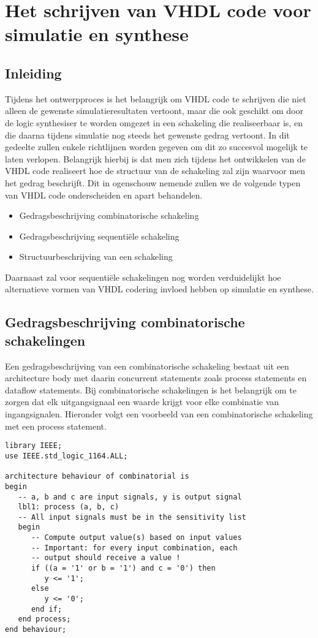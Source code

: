 \section{Het schrijven van VHDL code voor simulatie en synthese}
\label{good_vhdl}

\subsection{Inleiding}

Tijdens het ontwerpproces is het belangrijk om VHDL code te schrijven
die niet alleen de gewenste simulatieresultaten vertoont, maar die
ook geschikt om door de logic synthesiser te worden omgezet in
een schakeling die realiseerbaar is, en die daarna tijdens
simulatie nog steeds het gewenste gedrag vertoont.
In dit gedeelte zullen enkele richtlijnen worden gegeven
om dit zo succesvol mogelijk te laten verlopen.
Belangrijk hierbij is dat men zich tijdens het ontwikkelen
van de VHDL code realiseert hoe de structuur van de schakeling 
zal zijn waarvoor men het gedrag beschrijft.
Dit in ogenschouw nemende zullen we de volgende typen van VHDL 
code onderscheiden en apart behandelen.
\begin{itemize}
\item
Gedragsbeschrijving combinatorische schakeling
\item
Gedragsbeschrijving sequenti\"ele schakeling
\item
Structuurbeschrijving van een schakeling
\end{itemize}
Daarnaast zal voor sequenti\"ele schakelingen nog worden verduidelijkt
hoe alternatieve vormen van VHDL codering invloed hebben
op simulatie en synthese.

\subsection{Gedragsbeschrijving combinatorische schakelingen}

Een gedragsbeschrijving van een combinatorische schakeling bestaat
uit een architecture body met daarin concurrent statements zoals
process statements en dataflow statements. 
Bij combinatorische schakelingen is het belangrijk om te zorgen
dat elk uitgangsignaal een waarde krijgt voor elke combinatie
van ingangsignalen.
Hieronder volgt een voorbeeld van een combinatorische schakeling 
met een process statement.
\begin{verbatim}
library IEEE;
use IEEE.std_logic_1164.ALL;

architecture behaviour of combinatorial is
begin
   -- a, b and c are input signals, y is output signal
   lbl1: process (a, b, c)
   -- All input signals must be in the sensitivity list
   begin
      -- Compute output value(s) based on input values
      -- Important: for every input combination, each 
      -- output should receive a value !
      if ((a = '1' or b = '1') and c = '0') then
         y <= '1';
      else
         y <= '0';
      end if;
   end process;
end behaviour;
\end{verbatim}

